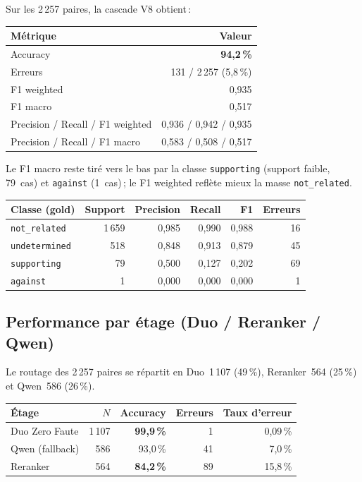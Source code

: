 Sur les 2\,257 paires, la cascade V8 obtient\,:

\begin{center}
\begin{tabular}{@{}lr@{}}
\toprule
Métrique & Valeur \\
\midrule
Accuracy & \textbf{94{,}2\,\%} \\
Erreurs & 131 / 2\,257 (5{,}8\,\%) \\
F1 weighted & 0{,}935 \\
F1 macro & 0{,}517 \\
Precision / Recall / F1 weighted & 0{,}936 / 0{,}942 / 0{,}935 \\
Precision / Recall / F1 macro & 0{,}583 / 0{,}508 / 0{,}517 \\
\bottomrule
\end{tabular}
\end{center}

Le F1 macro reste tiré vers le bas par la classe \texttt{supporting} (support faible, 79~cas) et \texttt{against} (1~cas)\,; le F1 weighted reflète mieux la masse \texttt{not\_related}.

\begin{center}
\begin{tabular}{@{}lrrrrr@{}}
\toprule
Classe (gold) & Support & Precision & Recall & F1 & Erreurs \\
\midrule
\texttt{not\_related} & 1\,659 & 0{,}985 & 0{,}990 & 0{,}988 & 16 \\
\texttt{undetermined} & 518 & 0{,}848 & 0{,}913 & 0{,}879 & 45 \\
\texttt{supporting} & 79 & 0{,}500 & 0{,}127 & 0{,}202 & 69 \\
\texttt{against} & 1 & 0{,}000 & 0{,}000 & 0{,}000 & 1 \\
\bottomrule
\end{tabular}
\end{center}

\subsection*{Performance par étage (Duo / Reranker / Qwen)}

Le routage des 2\,257 paires se répartit en Duo~1\,107 (49\,\%), Reranker~564 (25\,\%) et Qwen~586 (26\,\%).

\begin{center}
\begin{tabular}{@{}lrrrr@{}}
\toprule
Étage & $N$ & Accuracy & Erreurs & Taux d'erreur \\
\midrule
Duo Zero Faute & 1\,107 & \textbf{99{,}9\,\%} & 1 & 0{,}09\,\% \\
Qwen (fallback) & 586 & 93{,}0\,\% & 41 & 7{,}0\,\% \\
Reranker & 564 & \textbf{84{,}2\,\%} & 89 & 15{,}8\,\% \\
\bottomrule
\end{tabular}
\end{center}

